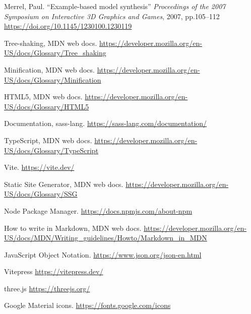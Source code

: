 \documentclass[letterpaper,11pt]{article}
\begin{document}
{\begin{thebibliography}{99}
 Merrel, Paul. ``Example-based model synthesis'' \textit{Proceedings of the 2007 Symposium on Interactive 3D Graphics and Games}, 2007, pp.105--112 \url{https://doi.org/10.1145/1230100.1230119}

 Tree-shaking, MDN web docs. \url{https://developer.mozilla.org/en-US/docs/Glossary/Tree_shaking}

 Minification, MDN web docs. \url{https://developer.mozilla.org/en-US/docs/Glossary/Minification}

 HTML5,  MDN web docs. \url{https://developer.mozilla.org/en-US/docs/Glossary/HTML5}

 Documentation, sass-lang. \url{https://sass-lang.com/documentation/}

 TypeScript,  MDN web docs. \url{https://developer.mozilla.org/en-US/docs/Glossary/TypeScript}

 Vite. \url{https://vite.dev/}

 Static Site Generator, MDN web docs. \url{https://developer.mozilla.org/en-US/docs/Glossary/SSG}

 Node Package Manager. \url{https://docs.npmjs.com/about-npm}

 How to write in Markdown, MDN web docs. \url{https://developer.mozilla.org/en-US/docs/MDN/Writing_guidelines/Howto/Markdown_in_MDN}

 JavaScript Object Notation. \url{https://www.json.org/json-en.html}

 Vitepress \url{https://vitepress.dev/}

 three.js \url{https://threejs.org/}

 Google Material icons. \url{https://fonts.google.com/icons}



\end{thebibliography}
} %
   
\end{document}

